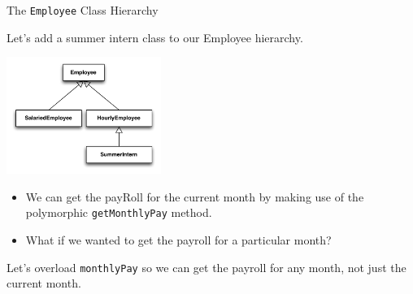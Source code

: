 \documentclass{beamer}
\author[Chris Simpkins] 
{Christopher Simpkins \\\texttt{chris.simpkins@gatech.edu}}
\institute[Georgia Tech] %
\date[CS 1331]{}
\begin{document}
\begin{frame}
  \titlepage
\end{frame}








\begin{frame}[fragile]{The {\tt Employee} Class Hierarchy}

Let's add a summer intern class to our Employee hierarchy.
\vspace{-.1in}
\begin{center}
\includegraphics[height=1.5in]{expanded-employee-class-hierarchy.pdf}
\end{center}

\begin{itemize}
\item We can get the payRoll for the current month by making use of the polymorphic {\tt getMonthlyPay} method.
\item What if we wanted to get the payroll for a particular month?
\end{itemize}

Let's overload {\tt monthlyPay} so we can get the payroll for any month, not just the current month.

\end{frame}
\end{document}
